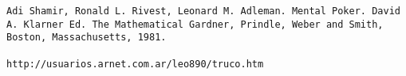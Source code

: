 \begin{verbatim}
Adi Shamir, Ronald L. Rivest, Leonard M. Adleman. Mental Poker. David A. Klarner Ed. The Mathematical Gardner, Prindle, Weber and Smith, Boston, Massachusetts, 1981.

http://usuarios.arnet.com.ar/leo890/truco.htm
\end{verbatim}
